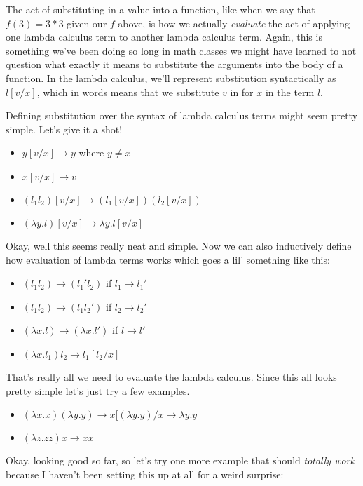 \documentclass[11pt]{article}
\begin{document}
The act of substituting in a value into a function, like when we say that $f(3) = 3*3$ given our $f$ above, is how we actually \emph{evaluate} the act of applying one lambda calculus term to another lambda calculus term. Again, this is something we've been doing so long in math classes we might have learned to not question what exactly it means to substitute the arguments into the body of a function. In the lambda calculus, we'll represent substitution syntactically as $l[v/x]$, which in words means that we substitute $v$ in for $x$ in the term $l$. 

Defining substitution over the syntax of lambda calculus terms might seem pretty simple. Let's give it a shot!

\begin{itemize}
\item $y[v/x] \to y$ where $y \not= x$
\item $x[v/x] \to v$
\item $(l_1 l_2)[v/x] \to (l_1[v/x]) (l_2[v/x])$
\item $(\lambda y. l)[v/x] \to \lambda y. l[v/x]$
\end{itemize}

Okay, well this seems really neat and simple. Now we can also inductively define how evaluation of lambda terms works which goes a lil' something like this: 

\begin{itemize}
\item $(l_1 l_2) \to (l_1' l_2)$ if $l_1 \to l_1'$
\item $(l_1 l_2) \to (l_1 l_2')$ if $l_2 \to l_2'$
\item $(\lambda x. l) \to (\lambda x. l')$ if $l \to l'$
\item $(\lambda x. l_1) l_2 \to l_1[l_2/x]$
\end{itemize}

That's really all we need to evaluate the lambda calculus. Since this all looks pretty simple let's just try a few examples. 

\begin{itemize}
\item $(\lambda x. x) (\lambda y.y) \to x[(\lambda y.y)/x \to \lambda y.y$
\item $(\lambda z. z z) x \to x x$
\end{itemize}

Okay, looking good so far, so let's try one more example that should \emph{totally work} because I haven't been setting this up at all for a weird surprise:
\end{document}

